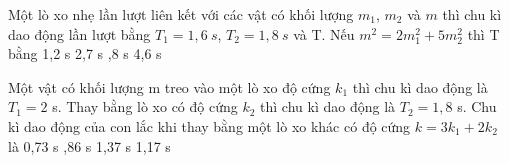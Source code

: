 \begin{ex}%
Một lò xo nhẹ lần lượt liên kết với các vật có khối lượng $m_1$, $m_2$ và $m$ thì chu kì dao động lần lượt bằng $T_1=1,6\ s$, $T_2=1,8\ s$ và T. Nếu $m^2=2m_1^2+5m_2^2$ thì T bằng
\choice
{1,2 s}
{2,7 s}
{,8 s}
{4,6 s}
\end{ex} 
\begin{ex}%
Một vật có khối lượng m treo vào một lò xo độ cứng $k_1$ thì chu kì dao động là $T_1 = 2$ s. Thay bằng lò xo có độ cứng $k_2$ thì chu kì dao động là $T_2 = 1,8$ s. Chu kì dao động của con lắc khi thay bằng một lò xo khác có độ cứng $k=3k_1+2k_2$ là
\choice
{0,73 s}
{,86 s}
{1,37 s}
{1,17 s}
\end{ex} 

